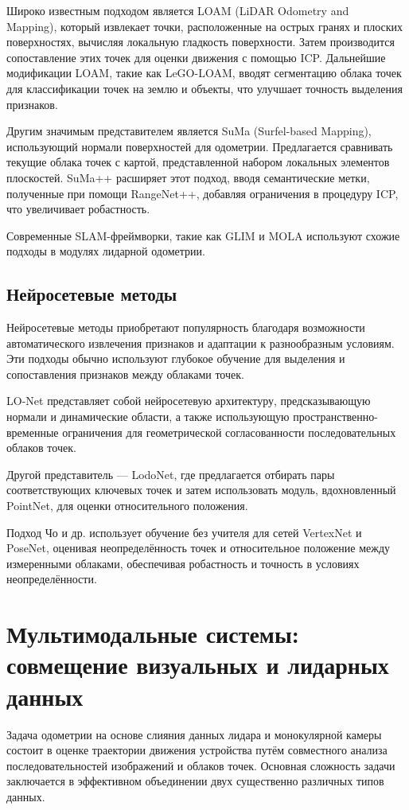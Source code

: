 Широко известным подходом является LOAM (LiDAR Odometry and \\Mapping), который 
извлекает точки, расположенные на острых гранях и плоских поверхностях, вычисляя 
локальную гладкость поверхности. Затем производится сопоставление этих точек для 
оценки движения с помощью ICP. Дальнейшие модификации LOAM, такие как LeGO-LOAM, вводят 
сегментацию облака точек для классификации точек на землю и объекты, что улучшает 
точность выделения признаков.

Другим значимым представителем является SuMa (Surfel-based Mapping), использующий нормали 
поверхностей для одометрии. Предлагается сравнивать текущие облака точек с картой, 
представленной набором локальных элементов плоскостей. SuMa++ расширяет этот подход, вводя 
семантические метки, полученные при помощи RangeNet++, добавляя 
ограничения в процедуру ICP, что увеличивает робастность.

Современные SLAM-фреймворки, такие как GLIM и MOLA используют схожие подходы в модулях
лидарной одометрии.

\subsection{Нейросетевые методы}
Нейросетевые методы приобретают популярность благодаря возможности автоматического 
извлечения признаков и адаптации к разнообразным условиям. Эти подходы обычно 
используют глубокое обучение для выделения и сопоставления признаков между облаками точек.

LO-Net представляет собой нейросетевую архитектуру, предсказывающую нормали и 
динамические области, а также использующую пространственно-временные ограничения 
для геометрической согласованности последовательных облаков точек. 

Другой представитель --- LodoNet, где предлагается отбирать пары соответствующих ключевых 
точек и затем использовать модуль, вдохновленный PointNet, для оценки относительного положения. 

Подход Чо и др. использует обучение без учителя для сетей VertexNet и PoseNet, оценивая 
неопределённость точек и относительное положение между измеренными облаками, обеспечивая 
робастность и точность в условиях неопределённости.


\section{Мультимодальные системы: совмещение визуальных и лидарных данных}
Задача одометрии на основе слияния данных лидара и монокулярной камеры состоит 
в оценке траектории движения устройства путём совместного анализа 
последовательностей изображений и облаков точек. Основная сложность задачи 
заключается в эффективном объединении двух существенно различных типов данных.

